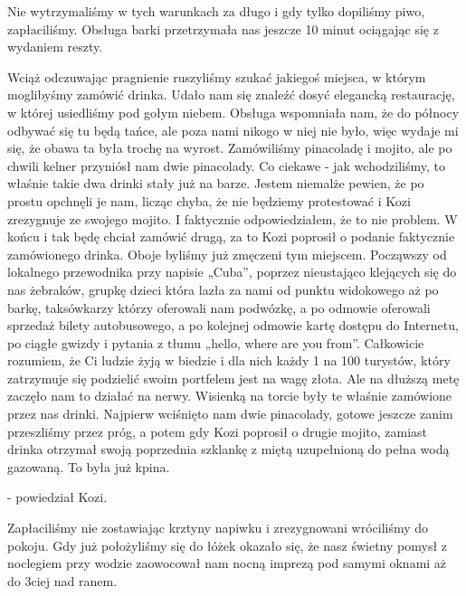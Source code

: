 Nie wytrzymaliśmy w tych warunkach za długo i gdy tylko dopiliśmy piwo, zapłaciliśmy.
Obsługa barki przetrzymała nas jeszcze 10 minut ociągając się z wydaniem reszty.
\par Wciąż odczuwając pragnienie ruszyliśmy szukać jakiegoś miejsca, w którym moglibyśmy zamówić drinka.
Udało nam się znaleźć dosyć elegancką restaurację, w której usiedliśmy pod gołym niebem.
Obsługa wspomniała nam, że do północy odbywać się tu będą tańce, ale poza nami nikogo w niej nie było, więc wydaje mi się, że obawa ta była trochę na wyrost.
Zamówiliśmy pinacoladę i mojito, ale po chwili kelner przyniósł nam dwie pinacolady.
Co ciekawe - jak wchodziliśmy, to właśnie takie dwa drinki stały już na barze.
Jestem niemalże pewien, że po prostu opchnęli je nam, licząc chyba, że nie będziemy protestować i Kozi zrezygnuje ze swojego mojito.
I faktycznie odpowiedziałem, że to nie problem. W końcu i tak będę chciał zamówić drugą, za to Kozi poprosił o podanie faktycznie zamówionego drinka.
Oboje byliśmy już zmęczeni tym miejscem.
Począwszy od lokalnego przewodnika przy napisie „Cuba”, poprzez nieustająco klejących się do nas żebraków, grupkę dzieci która lazła za nami od punktu widokowego aż po barkę, taksówkarzy którzy oferowali nam podwózkę, a po odmowie oferowali sprzedaż bilety autobusowego, a po kolejnej odmowie kartę dostępu do Internetu, po ciągłe gwizdy i pytania z tłumu „hello, where are you from”.
Całkowicie rozumiem, że Ci ludzie żyją w biedzie i dla nich każdy 1 na 100 turystów, który zatrzymuje się podzielić swoim portfelem jest na wagę złota.
Ale na dłuższą metę zaczęło nam to działać na nerwy.
Wisienką na torcie były te właśnie zamówione przez nas drinki.
Najpierw wciśnięto nam dwie pinacolady, gotowe jeszcze zanim przeszliśmy przez próg, a potem gdy Kozi poprosił o drugie mojito, zamiast drinka otrzymał swoją poprzednia szklankę z miętą uzupełnioną do pełna wodą gazowaną. To była już kpina.

\noindent - powiedział Kozi.
 
Zapłaciliśmy nie zostawiając krztyny napiwku i zrezygnowani wróciliśmy do pokoju.
Gdy już położyliśmy się do łóżek okazało się, że nasz świetny pomysł z noclegiem przy wodzie zaowocował nam nocną imprezą pod samymi oknami aż do 3ciej nad ranem.